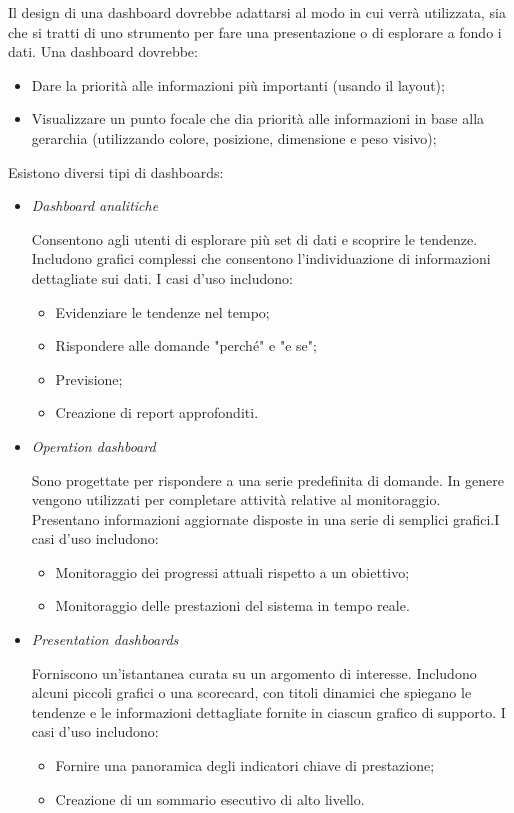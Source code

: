 \documentclass[12pt, a4paper]{report}
\begin{document}
	Il design di una dashboard dovrebbe adattarsi al modo in cui verrà utilizzata, sia che si tratti di uno strumento per fare una presentazione o di esplorare a fondo i dati. Una dashboard dovrebbe:
	\begin{itemize}
		\item Dare la priorità alle informazioni più importanti (usando il layout);
		\item Visualizzare un punto focale che dia priorità alle informazioni in base alla gerarchia (utilizzando colore, posizione, dimensione e peso visivo);
	\end{itemize}
	Esistono diversi tipi di dashboards:
	\begin{itemize}
		\item \textit{Dashboard analitiche}

		Consentono agli utenti di esplorare più set di dati e scoprire le tendenze. Includono grafici complessi che consentono l'individuazione di informazioni dettagliate sui dati. I casi d'uso includono:
		\begin{itemize}
			\item Evidenziare le tendenze nel tempo;
			\item Rispondere alle domande "perché" e "e se";
			\item Previsione;
			\item Creazione di report approfonditi.
		\end{itemize}
		\item \textit{Operation dashboard}

		Sono progettate per rispondere a una serie predefinita di domande. In genere vengono utilizzati per completare attività relative al monitoraggio. Presentano informazioni aggiornate disposte in una serie di semplici grafici.I casi d'uso includono:
		\begin{itemize}
			\item Monitoraggio dei progressi attuali rispetto a un obiettivo;
			\item Monitoraggio delle prestazioni del sistema in tempo reale.
		\end{itemize}
		\item \textit{Presentation dashboards}

		Forniscono un'istantanea curata su un argomento di interesse. Includono alcuni piccoli grafici o una scorecard, con titoli dinamici che spiegano le tendenze e le informazioni dettagliate fornite in ciascun grafico di supporto. I casi d'uso includono:
		\begin{itemize}
			\item Fornire una panoramica degli indicatori chiave di prestazione;
			\item Creazione di un sommario esecutivo di alto livello.
		\end{itemize}
	\end{itemize}
\end{document}
